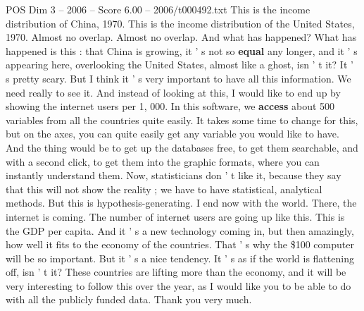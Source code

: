 \begin{textsample}{POS Dim 3 – 2006 – Score 6.00 – 2006/t000492.txt}
This is the income distribution of China, 1970.
This is the income distribution of the United States, 1970.
Almost no overlap.
Almost no overlap.
And what has happened?
What has happened is this : that China is growing, it ' s not so \textbf{equal} any longer, and it ' s appearing here, overlooking the United States, almost like a ghost, isn ' t it?
It ' s pretty scary.
But I think it ' s very important to have all this information.
We need really to see it.
And instead of looking at this, I would like to end up by showing the internet users per 1, 000.
In this software, we \textbf{access} about 500 variables from all the countries quite easily.
It takes some time to change for this, but on the axes, you can quite easily get any variable you would like to have.
And the thing would be to get up the databases free, to get them searchable, and with a second click, to get them into the graphic formats, where you can instantly understand them.
Now, statisticians don ' t like it, because they say that this will not show the reality ; we have to have statistical, analytical methods.
But this is hypothesis-generating.
I end now with the world.
There, the internet is coming.
The number of internet users are going up like this.
This is the GDP per capita.
And it ' s a new technology coming in, but then amazingly, how well it fits to the economy of the countries.
That ' s why the \$100 computer will be so important.
But it ' s a nice tendency.
It ' s as if the world is flattening off, isn ' t it?
These countries are lifting more than the economy, and it will be very interesting to follow this over the year, as I would like you to be able to do with all the publicly funded data.
Thank you very much.

\end{textsample}

